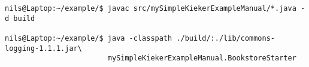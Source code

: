 \begin{lstlisting}
nils@Laptop:~/example/$ javac src/mySimpleKiekerExampleManual/*.java -d build

nils@Laptop:~/example/$ java -classpath ./build/:./lib/commons-logging-1.1.1.jar\
                        mySimpleKiekerExampleManual.BookstoreStarter 
\end{lstlisting}